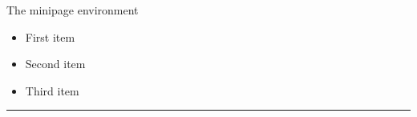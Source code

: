 \documentclass{beamer}
\begin{document}
\begin{frame}{The minipage environment}
\begin{minipage}{0.47\textwidth}
    \begin{itemize}
        \item First item
        \item Second item
        \item Third item
    \end{itemize}
\end{minipage}
\begin{minipage}{0.5\textwidth}
    \rule{\textwidth}{0.75\textwidth}
\end{minipage}
\end{frame}
\end{document}
